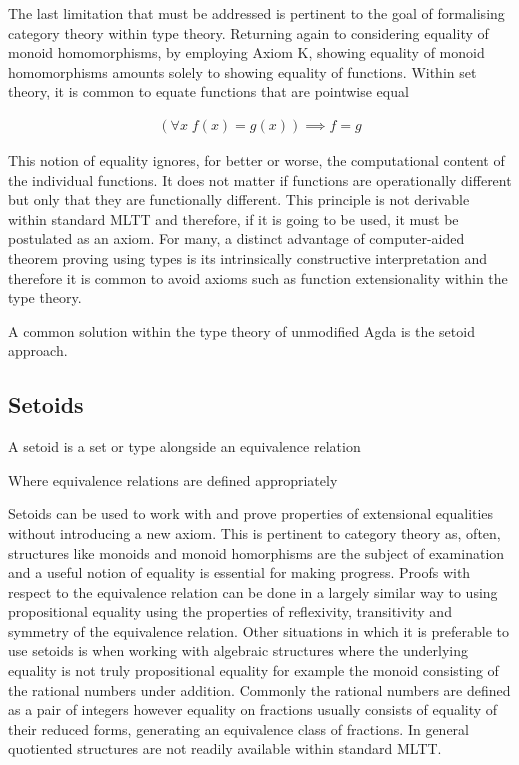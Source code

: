 The last limitation that must be addressed is pertinent to the goal of
formalising category theory within type theory. Returning again to considering
equality of monoid homomorphisms, by employing \textsf{Axiom K}, showing
equality of monoid homomorphisms amounts solely to showing equality of
functions. Within set theory, it is common to equate functions that are
pointwise equal

\begin{align*}
    (\forall x \; f(x) = g(x)) \implies f=g
\end{align*}

This notion of equality ignores, for better or worse, the computational content
of the individual functions. It does not matter if functions are operationally
different but only that they are functionally different. This principle is not
derivable within standard MLTT and therefore, if it is going to be used, it must
be postulated as an axiom. For many, a distinct advantage of computer-aided
theorem proving using types is its intrinsically constructive interpretation and
therefore it is common to avoid axioms such as function extensionality within
the type theory.


A common solution within the type theory of unmodified Agda is the setoid
approach.

\subsection{Setoids}
\label{section:setoids}
A setoid is a set or type alongside an equivalence relation


Where equivalence relations are defined appropriately


Setoids can be used to work with and prove properties of
extensional equalities without introducing a new axiom. This is pertinent to
category theory as, often, structures like monoids and monoid homorphisms are
the subject of examination and a useful notion of equality is essential for
making progress. Proofs with respect to the equivalence relation can be done in
a largely similar way to using propositional equality using the properties of
reflexivity, transitivity and symmetry of the equivalence relation. Other situations in which it is preferable to use setoids is when
working with algebraic structures where the underlying equality is not truly
propositional equality for example the monoid consisting of the rational numbers
under addition. Commonly the rational numbers are defined as a pair of integers
however equality on fractions usually consists of equality of their reduced
forms, generating an equivalence class of fractions. In general quotiented
structures are not readily available within standard MLTT.

